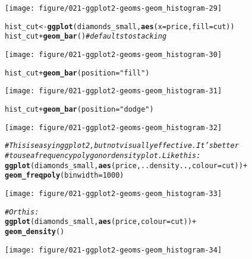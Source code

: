 \documentclass[a4paper,titlepage]{tufte-handout}\usepackage[]{graphicx}\usepackage[]{color}
\makeatletter
\def\maxwidth{ %
  \ifdim\Gin@nat@width>\linewidth
    \linewidth
  \else
    \Gin@nat@width
  \fi
}
\newcommand{\hlnum}[1]{\textcolor[rgb]{0.686,0.059,0.569}{#1}}%
\newcommand{\hlstr}[1]{\textcolor[rgb]{0.192,0.494,0.8}{#1}}%
\newcommand{\hlcom}[1]{\textcolor[rgb]{0.678,0.584,0.686}{\textit{#1}}}%
\newcommand{\hlopt}[1]{\textcolor[rgb]{0,0,0}{#1}}%
\newcommand{\hlstd}[1]{\textcolor[rgb]{0.345,0.345,0.345}{#1}}%
\newcommand{\hlkwb}[1]{\textcolor[rgb]{0.69,0.353,0.396}{#1}}%
\newcommand{\hlkwc}[1]{\textcolor[rgb]{0.333,0.667,0.333}{#1}}%
\newcommand{\hlkwd}[1]{\textcolor[rgb]{0.737,0.353,0.396}{\textbf{#1}}}%
\newenvironment{kframe}{%
 \def\at@end@of@kframe{}%
 \ifinner\ifhmode%
  \def\at@end@of@kframe{\end{minipage}}%
  \begin{minipage}{\columnwidth}%
 \fi\fi%
 \def\FrameCommand##1{\hskip\@totalleftmargin \hskip-\fboxsep
 \colorbox{shadecolor}{##1}\hskip-\fboxsep
     \hskip-\linewidth \hskip-\@totalleftmargin \hskip\columnwidth}%
 \MakeFramed {\advance\hsize-\width
   \@totalleftmargin\z@ \linewidth\hsize
   \@setminipage}}%
 {\par\unskip\endMakeFramed%
 \at@end@of@kframe}
\newenvironment{knitrout}{}{} %
\makeatother
\begin{document}
\begin{knitrout}
\begin{kframe}
\begin{alltt}
\end{alltt}
\end{kframe}
\texttt{[image: figure/021-ggplot2-geoms-geom\_histogram-29]} 
\begin{kframe}\begin{alltt}
\hlstd{hist_cut} \hlkwb{<-} \hlkwd{ggplot}\hlstd{(diamonds_small,} \hlkwd{aes}\hlstd{(}\hlkwc{x}\hlstd{=price,} \hlkwc{fill}\hlstd{=cut))}
\hlstd{hist_cut} \hlopt{+} \hlkwd{geom_bar}\hlstd{()} \hlcom{# defaults to stacking}
\end{alltt}
\end{kframe}
\texttt{[image: figure/021-ggplot2-geoms-geom\_histogram-30]} 
\begin{kframe}\begin{alltt}
\hlstd{hist_cut} \hlopt{+} \hlkwd{geom_bar}\hlstd{(}\hlkwc{position}\hlstd{=}\hlstr{"fill"}\hlstd{)}
\end{alltt}
\end{kframe}
\texttt{[image: figure/021-ggplot2-geoms-geom\_histogram-31]} 
\begin{kframe}\begin{alltt}
\hlstd{hist_cut} \hlopt{+} \hlkwd{geom_bar}\hlstd{(}\hlkwc{position}\hlstd{=}\hlstr{"dodge"}\hlstd{)}
\end{alltt}
\end{kframe}
\texttt{[image: figure/021-ggplot2-geoms-geom\_histogram-32]} 
\begin{kframe}\begin{alltt}
\hlcom{# This is easy in ggplot2, but not visually effective.  It's better}
\hlcom{# to use a frequency polygon or density plot.  Like this:}
\hlkwd{ggplot}\hlstd{(diamonds_small,} \hlkwd{aes}\hlstd{(price, ..density..,} \hlkwc{colour} \hlstd{= cut))} \hlopt{+}
  \hlkwd{geom_freqpoly}\hlstd{(}\hlkwc{binwidth} \hlstd{=} \hlnum{1000}\hlstd{)}
\end{alltt}
\end{kframe}
\texttt{[image: figure/021-ggplot2-geoms-geom\_histogram-33]} 
\begin{kframe}\begin{alltt}
\hlcom{# Or this:}
\hlkwd{ggplot}\hlstd{(diamonds_small,} \hlkwd{aes}\hlstd{(price,} \hlkwc{colour} \hlstd{= cut))} \hlopt{+}
  \hlkwd{geom_density}\hlstd{()}
\end{alltt}
\end{kframe}
\texttt{[image: figure/021-ggplot2-geoms-geom\_histogram-34]} 
\begin{kframe}\begin{alltt}

\end{alltt}
\end{kframe}
\end{knitrout}
\end{document}
